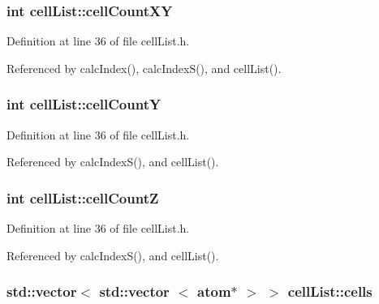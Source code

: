 \subsubsection[{cell\+Count\+X\+Y}]{\setlength{\rightskip}{0pt plus 5cm}int cell\+List\+::cell\+Count\+X\+Y}\label{classcell_list_a619d607f8569876cead1bdfad239d4b2}


Definition at line 36 of file cell\+List.\+h.



Referenced by calc\+Index(), calc\+Index\+S(), and cell\+List().

\hypertarget{classcell_list_aa0c942e7b0b61cda1d688ffc96e8f1c8}{}
\subsubsection[{cell\+Count\+Y}]{\setlength{\rightskip}{0pt plus 5cm}int cell\+List\+::cell\+Count\+Y}\label{classcell_list_aa0c942e7b0b61cda1d688ffc96e8f1c8}


Definition at line 36 of file cell\+List.\+h.



Referenced by calc\+Index\+S(), and cell\+List().

\hypertarget{classcell_list_a2b506715c6ded7cb9fadf994f4f01785}{}
\subsubsection[{cell\+Count\+Z}]{\setlength{\rightskip}{0pt plus 5cm}int cell\+List\+::cell\+Count\+Z}\label{classcell_list_a2b506715c6ded7cb9fadf994f4f01785}


Definition at line 36 of file cell\+List.\+h.



Referenced by calc\+Index\+S(), and cell\+List().

\hypertarget{classcell_list_a10bc0c3ae819293b1e88bc7d1bfdb2aa}{}
\subsubsection[{cells}]{\setlength{\rightskip}{0pt plus 5cm}std\+::vector$<$ std\+::vector $<$ {\bf atom}$\ast$ $>$ $>$ cell\+List\+::cells}\label{classcell_list_a10bc0c3ae819293b1e88bc7d1bfdb2aa}



